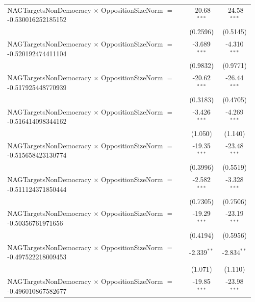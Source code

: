 \begin{tabular}{lcc}
   NAGTargetsNonDemocracy $\times$ OppositionSizeNorm $=$ -0.530016252185152    & -20.68$^{***}$       & -24.58$^{***}$\\   
                                                                                & (0.2596)             & (0.5145)\\   
   NAGTargetsNonDemocracy $\times$ OppositionSizeNorm $=$ -0.520192474411104    & -3.689$^{***}$       & -4.310$^{***}$\\   
                                                                                & (0.9832)             & (0.9771)\\   
   NAGTargetsNonDemocracy $\times$ OppositionSizeNorm $=$ -0.517925448770939    & -20.62$^{***}$       & -26.44$^{***}$\\   
                                                                                & (0.3183)             & (0.4705)\\   
   NAGTargetsNonDemocracy $\times$ OppositionSizeNorm $=$ -0.516414098344162    & -3.426$^{***}$       & -4.269$^{***}$\\   
                                                                                & (1.050)              & (1.140)\\   
   NAGTargetsNonDemocracy $\times$ OppositionSizeNorm $=$ -0.515658423130774    & -19.35$^{***}$       & -23.48$^{***}$\\   
                                                                                & (0.3996)             & (0.5519)\\   
   NAGTargetsNonDemocracy $\times$ OppositionSizeNorm $=$ -0.511124371850444    & -2.582$^{***}$       & -3.328$^{***}$\\   
                                                                                & (0.7305)             & (0.7506)\\   
   NAGTargetsNonDemocracy $\times$ OppositionSizeNorm $=$ -0.50356761971656     & -19.29$^{***}$       & -23.19$^{***}$\\   
                                                                                & (0.4194)             & (0.5956)\\   
   NAGTargetsNonDemocracy $\times$ OppositionSizeNorm $=$ -0.497522218009453    & -2.339$^{**}$        & -2.834$^{**}$\\   
                                                                                & (1.071)              & (1.110)\\   
   NAGTargetsNonDemocracy $\times$ OppositionSizeNorm $=$ -0.496010867582677    & -19.85$^{***}$       & -23.98$^{***}$\\   

\end{tabular}
